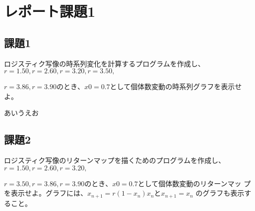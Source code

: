 \section{レポート課題1}
\subsection{課題1}
ロジスティク写像の時系列変化を計算するプログラムを作成し、$r = 1.50, r = 2.60,r = 3.20, r = 3.50,$ \par
$r = 3.86, r = 3.90 のとき、x0 = 0.7$として個体数変動の時系列グラフを表示せよ。\par
あいうえお
\subsection{課題2}
ロジスティク写像のリターンマップを描くためのプログラムを作成し、$r = 1.50, r = 2.60, r = 3.20,$ \par
$r = 3.50, r = 3.86, r = 3.90 のとき、x0 = 0.7$として個体数変動のリターンマッ
プを表示せよ。グラフには、$x_{n+1} = r(1 −x_n)x_n とx_{n+1} = x_n$ のグラフも表示すること。